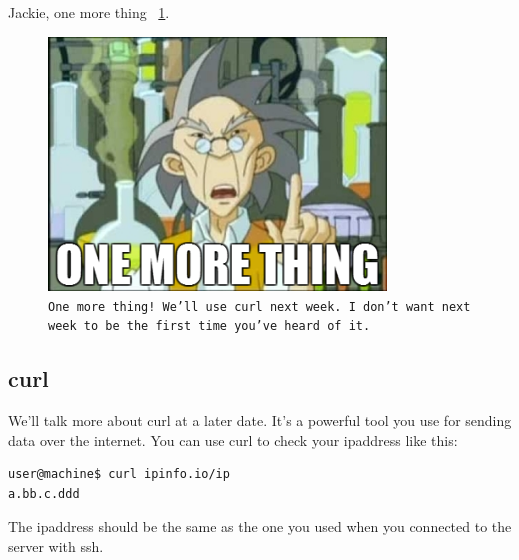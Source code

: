 \documentclass[12pt,a4paper]{article}
\begin{document}
Jackie, one more thing ~\ref{fig:jackie}.

\begin{figure}[h]
\centering
	\includegraphics[width=0.8\textwidth]{Images/jackie.png}
	\caption{{\small \texttt{One more thing! We'll use curl next week. I don't
want next week to be the first time you've heard of it.}}}
	\label{fig:jackie}
\end{figure}

\subsection{curl}
We'll talk more about curl at a later date. It's a powerful tool you use for
sending data over the internet. You can use curl to check your ipaddress like
this:

\begin{lstlisting}[language=bash]
user@machine$ curl ipinfo.io/ip
a.bb.c.ddd
\end{lstlisting}

The ipaddress should be the same as the one you used when you connected to the
server with ssh.
\end{document}
